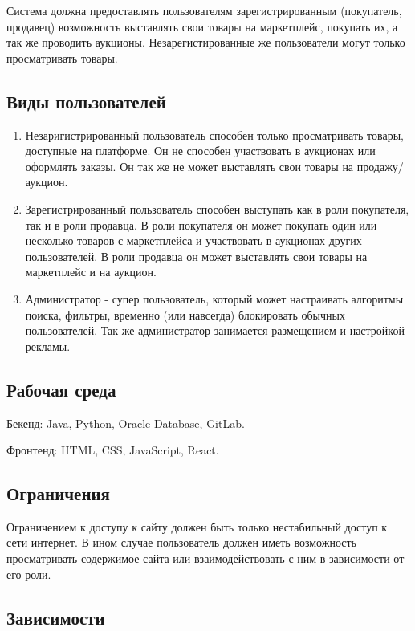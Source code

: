 \documentclass{article}
\begin{document}
Система должна предоставлять пользователям зарегистрированным (покупатель, продавец) возможность выставлять свои товары на маркетплейс, покупать их, а так же проводить аукционы. Незарегистированные же пользователи могут только просматривать товары.

\subsection{Виды пользователей}
\begin{enumerate}
    \item Незаригистрированный пользователь способен только просматривать товары, доступные на платформе. Он не способен участвовать в аукционах или оформлять заказы. Он так же не может выставлять свои товары на продажу/аукцион.
    \item Зарегистрированный пользователь способен выступать как в роли покупателя, так и в роли продавца. В роли покупателя он может покупать один или несколько товаров с маркетплейса и участвовать в аукционах других пользователей. В роли продавца он может выставлять свои товары на маркетплейс и на аукцион.
    \item Администратор - супер пользователь, который может настраивать алгоритмы поиска, фильтры, временно (или навсегда) блокировать обычных пользователей. Так же администратор занимается размещением и настройкой рекламы. 
\end{enumerate}

\subsection{Рабочая среда}

 Бекенд: Java, Python, Oracle Database, GitLab.

 Фронтенд: HTML, CSS, JavaScript, React.

\subsection{Ограничения}

Ограничением к доступу к сайту должен быть только нестабильный доступ к сети интернет. В ином случае пользователь должен иметь возможность просматривать содержимое сайта или взаимодействовать с ним в зависимости от его роли.

\subsection{Зависимости}
\end{document}
